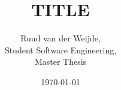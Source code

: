 \documentclass[12pt]{article}
\title{TITLE}
\author{Ruud van der Weijde, \\Student Software Engineering, \\Master Thesis}
\date{\today}
\begin{document}
	\maketitle

	\begin{abstract}
		
	\end{abstract}
	\clearpage
	
	
	
	
	
	

	\printbibliography
\end{document}
